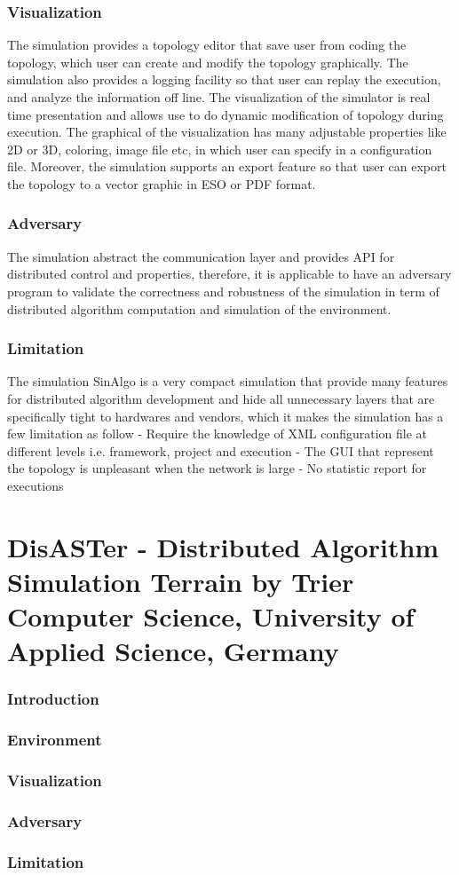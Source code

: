 \subsubsection{Visualization}
The simulation provides a topology editor that save user from coding the topology, which user can create and modify the topology graphically. The simulation also provides a logging facility so that user can replay the execution, and analyze the information off line. The visualization of the simulator is real time presentation and allows use to do dynamic modification of topology during execution. The graphical of the visualization has many adjustable properties like 2D or 3D, coloring, image file etc, in which user can specify in a configuration file. Moreover, the simulation supports an export feature so that user can export the topology to a vector graphic in ESO or PDF format.

\subsubsection{Adversary}
The simulation abstract the communication layer and provides API for distributed control and properties, therefore, it is applicable to have an adversary program to validate the correctness and robustness of the simulation in term of distributed algorithm computation and simulation of the environment.

\subsubsection{Limitation}
The simulation SinAlgo is a very compact simulation that provide many features for distributed algorithm development and hide all unnecessary layers that are specifically tight to hardwares and vendors, which it makes the simulation has a few limitation as follow
- Require the knowledge of XML configuration file at different levels i.e. framework, project and execution
- The GUI that represent the topology is unpleasant when the network is large
- No statistic report for executions

\section{DisASTer - Distributed Algorithm Simulation Terrain by Trier Computer Science, University of Applied Science, Germany}
\subsubsection{Introduction}
\subsubsection{Environment}
\subsubsection{Visualization}
\subsubsection{Adversary}
\subsubsection{Limitation}



